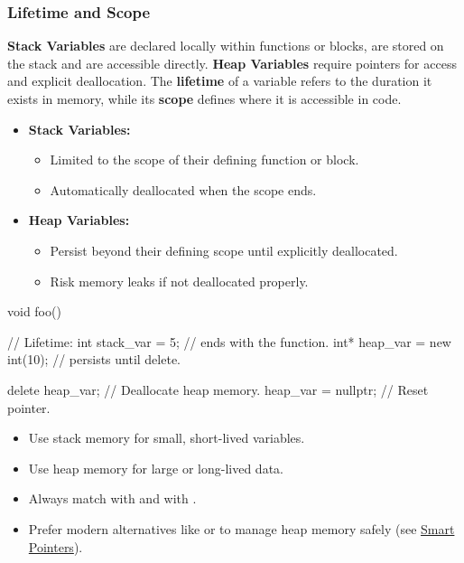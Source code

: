 \subsubsection{Lifetime and Scope}

\textbf{Stack Variables} are declared locally within functions or blocks, are stored on the stack and are accessible directly.
\textbf{Heap Variables} require pointers for access and explicit deallocation.
The \textbf{lifetime} of a variable refers to the duration it exists in memory, while its \textbf{scope} defines where it is accessible in code.

\begin{itemize}
    \item \textbf{Stack Variables:}
    \begin{itemize}
        \item Limited to the scope of their defining function or block.
        \item Automatically deallocated when the scope ends.
    \end{itemize}

    \item \textbf{Heap Variables:}
    \begin{itemize}
        \item Persist beyond their defining scope until explicitly deallocated.
        \item Risk memory leaks if not deallocated properly.
    \end{itemize}
\end{itemize}

\begin{codeblock}[language=C++]
void foo() {                      //        Lifetime:
    int stack_var = 5;            // ends with the function.
    int* heap_var = new int(10);  // persists until delete.

    delete heap_var;      // Deallocate heap memory.
    heap_var = nullptr;   // Reset pointer.
}
\end{codeblock}

\begin{tipsblock}
    \begin{itemize}
        \item Use stack memory for small, short-lived variables.
        \item Use heap memory for large or long-lived data.
        \item Always match  with  and  with .
        \item Prefer modern alternatives like  or  to manage heap memory safely (see \hyperref[sec:smart_pointers]{Smart Pointers}).
    \end{itemize}
\end{tipsblock}

